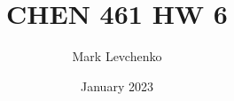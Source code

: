 \documentclass[12pt]{article}
\title{CHEN 461 HW 6}
\author{Mark Levchenko}
\date{January 2023}
\begin{document}
\begin{enumerate}

    

    

    

    
    
\end{enumerate}
\end{document}
